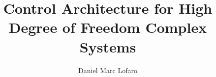 \documentclass[12pt, letterpaper]{drexelthesis}
\author{Daniel Marc Lofaro}
\title{Control Architecture for High Degree of Freedom Complex Systems}
\begin{document}
 



	\doublespacing
	\maketitle 
\begin{preliminary}
	\sloppy
	\copyrightpage
	
	
	
	
	
	
	\mytableofcontents
	\mylistoftables
	\mylistoffigures
\end{preliminary}

\begin{thesis}
	\fussy
	
	
	
	
	
	

	\singlespacing
%	
%	
	
	
%	

	\appendix
\end{thesis}
\end{document}
